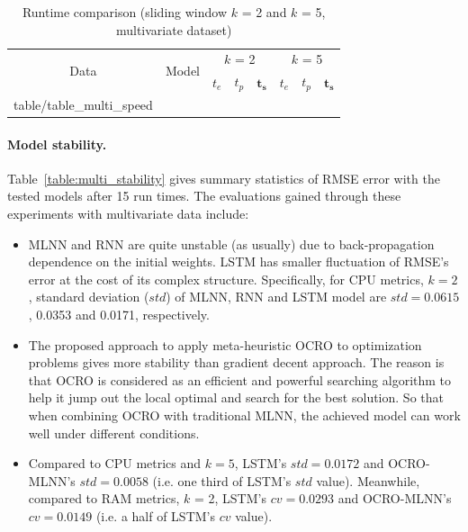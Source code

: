 \documentclass[smallcondensed, natbib]{svjour3}     %
\makeatletter
\newcommand\primitiveinput[1]
		{\@@input #1 }
\makeatother
\begin{document}
{%
\begin{table}[!h]
	\caption{Runtime comparison (sliding window $k$ = 2 and $k$ = 5, multivariate dataset)}
	\label{table:multi_speed}
	\centering
	\begin{adjustbox}{width=0.7\textwidth}
		\begin{tabular}{| c | c | c | c | c | c | c | c |}%
			\hline
			\multirow{2}{*}{Data} & \multirow{2}{*}{Model} & \multicolumn{3}{c|}{$k$ = 2} & \multicolumn{3}{c|}{ $k$ = 5 } \\ \cline{3-8}
   				& & $t_e$ & $t_p$ & $\boldsymbol{t_s}$ & $t_e$ & $t_p$ & $\boldsymbol{t_s}$  \\ [0.5ex] \hline
			\primitiveinput{table/table_multi_speed}
			\hline
		\end{tabular}
	\end{adjustbox}
\end{table}

\paragraph{\textbf{Model stability.}} Table~\ref{table:multi_stability} gives summary statistics of RMSE error with the tested models after 15 run times. The evaluations gained through these experiments with multivariate data include:
\begin{itemize}
	\item MLNN and RNN are quite unstable (as usually) due to back-propagation dependence on the initial weights. LSTM has smaller fluctuation of RMSE's error at the cost of its complex structure. Specifically, for CPU metrics, $k = 2$, standard deviation ($std$) of MLNN, RNN and LSTM model are $std = 0.0615$, 0.0353 and 0.0171, respectively. 
	\item The proposed approach to apply meta-heuristic OCRO to optimization problems gives more stability than gradient decent approach. The reason is that OCRO is considered as an efficient and powerful searching algorithm to help it jump out the local optimal and search for the best solution. So that when combining OCRO with traditional MLNN, the achieved model can work well under different conditions. 
	\item Compared to CPU metrics and $k = 5$, LSTM's $std = 0.0172$ and OCRO-MLNN's $std= 0.0058$ (i.e. one third of LSTM's $std$ value). Meanwhile, compared to RAM metrics, $k$ = 2, LSTM's $cv = 0.0293$ and OCRO-MLNN's $cv=0.0149$ (i.e. a half of LSTM's $cv$ value). 
\end{itemize}

}
\end{document}
